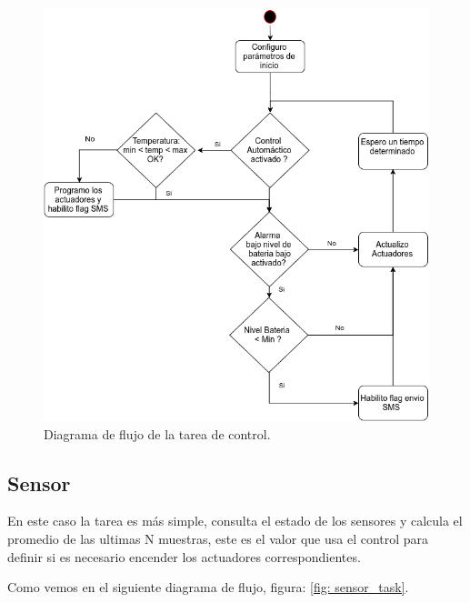 \begin{itemize}
\begin{figure}[!htb]
  \centering
  \includegraphics[scale=.5]{./Figures/control_task.png}
  \caption{Diagrama de flujo de la tarea de control.}
  \label{fig:control_task}
\end{figure}


\subsection*{Sensor}
 En este caso la tarea es más simple, consulta el estado de los sensores y calcula el promedio de las ultimas N muestras, este es el valor que usa el control para definir si es necesario encender los actuadores correspondientes.

 Como vemos en el siguiente diagrama de flujo, figura: \ref{fig: sensor_task}.


\end{itemize}
